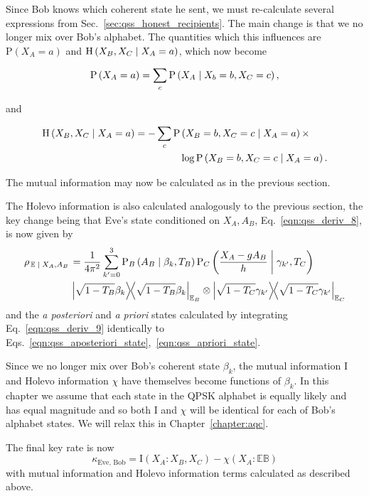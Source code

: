 Since Bob knows which coherent state he sent, we must re-calculate several expressions from Sec.~\ref{sec:qss_honest_recipients}. The main change is that we no longer mix over Bob's alphabet. The quantities which this influences are $\text{P}\left(X_A=a\right)$ and $\text{H}\left(X_B, X_C \; \middle| \; X_A=a\right)$, which now become

\begin{equation}
\text{P}\left(X_A=a\right) = \sum_{c} \text{P}\left(X_A \; \middle| \; X_b=b, X_C=c\right),
\end{equation}

\noindent and

\begin{align}
\text{H}\left(X_B, X_C \; \middle| \; X_A=a\right) = - \sum_{c} \text{P}&\left(X_B=b, X_C=c \; \middle| \; X_A=a\right) \times \notag \\
&\log \text{P}\left(X_B=b, X_C=c \; \middle| \; X_A=a\right).
\end{align}

\noindent The mutual information may now be calculated as in the previous section. 

The Holevo information is also calculated analogously to the previous section, the key change being that Eve's state conditioned on $X_A, A_B$, Eq.~\ref{eqn:qss_deriv_8}, is now given by
\begin{align}\label{eqn:qss_deriv_9}
\rho_{\left.\mathbb{E} \given X_A, A_B\right.} &= \frac{1}{4 \pi^2} \sum_{k^\prime=0}^3 \text{P}_B\left(A_B \given \beta_k, T_B\right) \text{P}_C\left(\frac{X_A - g A_B}{h} \given \gamma_{k^\prime}, T_C\right) \notag \\
%
&\dyad{\sqrt{1-T_B} \beta_k}_{\mathbb{E}_B} \otimes \dyad{\sqrt{1-T_C}\gamma_{k^\prime}}_{\mathbb{E}_C}
\end{align}
and the \emph{a posteriori} and \emph{a priori} states calculated by integrating Eq.~\ref{eqn:qss_deriv_9} identically to Eqs.~\ref{eqn:qss_aposteriori_state},~\ref{eqn:qss_apriori_state}.

Since we no longer mix over Bob's coherent state $\beta_k$, the mutual information $\text{I}$ and Holevo information $\chi$ have themselves become functions of $\beta_k$. In this chapter we assume that each state in the QPSK alphabet is equally likely and has equal magnitude and so both $\text{I}$ and $\chi$ will be identical for each of Bob's alphabet states. We will relax this in Chapter~\ref{chapter:aqc}.


The final key rate is now
\begin{equation}\label{eqn:qss_keyrate_dishonest_Bob}
\kappa_{\text{Eve, Bob}} = \text{I}\left(X_A : X_B, X_C\right) - \chi\left(X_A : \mathbb{E} \mathbb{B}\right)
\end{equation}
with mutual information and Holevo information terms calculated as described above.


